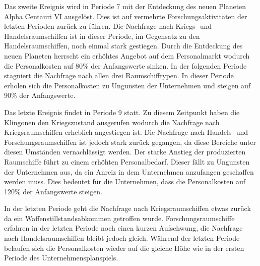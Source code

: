 Das zweite Ereignis wird in Periode 7 mit der Entdeckung des neuen Planeten Alpha Centauri VI ausgelöst. Dies ist auf vermehrte Forschungsaktivitäten der letzten Perioden zurück zu führen. Die Nachfrage nach Kriegs- und Handelsraumschiffen ist in dieser Periode, im Gegensatz zu den Handelsraumschiffen, noch einmal stark gestiegen. Durch die Entdeckung des neuen Planeten herrscht ein erhöhtes Angebot auf dem Personalmarkt wodurch die Personalkosten auf 80\% der Anfangswerte sinken. In der folgenden Periode stagniert die Nachfrage nach allen drei Raumschifftypen. In dieser Periode erholen sich die Personalkosten zu Ungunsten der Unternehmen und steigen auf 90\% der Anfangswerte. 

Das letzte Ereignis findet in Periode 9 statt. Zu diesem Zeitpunkt haben die Klingonen den Kriegszustand ausgerufen wodurch die Nachfrage nach Kriegsraumschiffen erheblich angestiegen ist. Die Nachfrage nach Handels- und Forschungsraumschiffen ist jedoch stark zurück gegangen, da diese Bereiche unter diesen Umständen vernachlässigt werden. Der starke Anstieg der produzierten Raumschiffe führt zu einem erhöhten Personalbedarf. Dieser fällt zu Ungunsten der Unternehmen aus, da ein Anreiz in dem Unternehmen anzufangen geschaffen werden muss. Dies bedeutet für die Unternehmen, dass die Personalkosten auf 120\% der Anfangswerte steigen. 

In der letzten Periode geht die Nachfrage nach Kriegsraumschiffen etwas zurück da ein Waffenstillstandsabkommen getroffen wurde. Forschungsraumschiffe erfahren in der letzten Periode noch einen kurzen Aufschwung, die Nachfrage nach Handelsraumschiffen bleibt jedoch gleich. Während der letzten Periode belaufen sich die Personalkosten wieder auf die gleiche Höhe wie in der ersten Periode des Unternehmensplanspiels.

